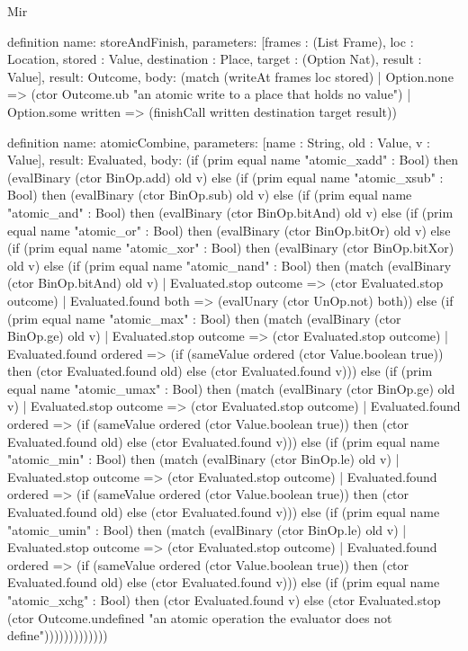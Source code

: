 \begin{lexlean}{Mir}
\begin{semanticmodule}
definition{
  name: storeAndFinish,
  parameters: [frames : (List Frame), loc : Location, stored : Value, destination : Place, target : (Option Nat), result : Value],
  result: Outcome,
  body: (match (writeAt frames loc stored)
    | Option.none => (ctor Outcome.ub "an atomic write to a place that holds no value")
    | Option.some written => (finishCall written destination target result))
}

definition{
  name: atomicCombine,
  parameters: [name : String, old : Value, v : Value],
  result: Evaluated,
  body: (if (prim equal name "atomic_xadd" : Bool) then (evalBinary (ctor BinOp.add) old v) else (if (prim equal name "atomic_xsub" : Bool) then (evalBinary (ctor BinOp.sub) old v) else (if (prim equal name "atomic_and" : Bool) then (evalBinary (ctor BinOp.bitAnd) old v) else (if (prim equal name "atomic_or" : Bool) then (evalBinary (ctor BinOp.bitOr) old v) else (if (prim equal name "atomic_xor" : Bool) then (evalBinary (ctor BinOp.bitXor) old v) else (if (prim equal name "atomic_nand" : Bool) then (match (evalBinary (ctor BinOp.bitAnd) old v) | Evaluated.stop outcome => (ctor Evaluated.stop outcome) | Evaluated.found both => (evalUnary (ctor UnOp.not) both)) else (if (prim equal name "atomic_max" : Bool) then (match (evalBinary (ctor BinOp.ge) old v) | Evaluated.stop outcome => (ctor Evaluated.stop outcome) | Evaluated.found ordered => (if (sameValue ordered (ctor Value.boolean true)) then (ctor Evaluated.found old) else (ctor Evaluated.found v))) else (if (prim equal name "atomic_umax" : Bool) then (match (evalBinary (ctor BinOp.ge) old v) | Evaluated.stop outcome => (ctor Evaluated.stop outcome) | Evaluated.found ordered => (if (sameValue ordered (ctor Value.boolean true)) then (ctor Evaluated.found old) else (ctor Evaluated.found v))) else (if (prim equal name "atomic_min" : Bool) then (match (evalBinary (ctor BinOp.le) old v) | Evaluated.stop outcome => (ctor Evaluated.stop outcome) | Evaluated.found ordered => (if (sameValue ordered (ctor Value.boolean true)) then (ctor Evaluated.found old) else (ctor Evaluated.found v))) else (if (prim equal name "atomic_umin" : Bool) then (match (evalBinary (ctor BinOp.le) old v) | Evaluated.stop outcome => (ctor Evaluated.stop outcome) | Evaluated.found ordered => (if (sameValue ordered (ctor Value.boolean true)) then (ctor Evaluated.found old) else (ctor Evaluated.found v))) else (if (prim equal name "atomic_xchg" : Bool) then (ctor Evaluated.found v) else (ctor Evaluated.stop (ctor Outcome.undefined "an atomic operation the evaluator does not define")))))))))))))
}


\end{semanticmodule}
\end{lexlean}
